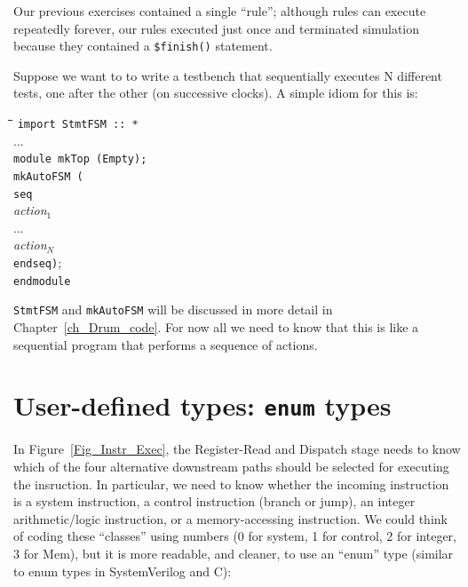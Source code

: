 \label{BSV_small_testbench}


Our previous exercises contained a single ``rule''; although rules can
execute repeatedly forever, our rules executed just once and
terminated simulation because they contained a \verb|$finish()|
statement.

Suppose we want to to write a testbench that sequentially executes N
different tests, one after the other (on successive clocks).  A simple
idiom for this is:

{\footnotesize
\begin{tabbing}
\hmmm \= \hm \= \hm \= \hm \= \kill
      \> {\tt import StmtFSM :: *} \\
      \> ... \\
      \> {\tt module mkTop (Empty);} \\
      \>     \> {\tt mkAutoFSM (} \\
      \>     \>     \> {\tt seq} \\
      \>     \>     \>     \> \emph{action$_1$} \\
      \>     \>     \>     \> ... \\
      \>     \>     \>     \> \emph{action$_N$} \\
      \>     \>     \> {\tt endseq)}; \\
      \> {\tt endmodule}
\end{tabbing}}

{\tt StmtFSM} and \verb|mkAutoFSM| will be discussed in more detail in
Chapter~\ref{ch_Drum_code}.  For now all we need to know that this is
like a sequential program that performs a sequence of actions.




\section{User-defined types: {\tt enum} types}

\label{BSV_enum_types}


In Figure~\ref{Fig_Instr_Exec}, the Register-Read and Dispatch stage
needs to know which of the four alternative downstream paths should be
selected for executing the insruction.  In particular, we need to know
whether the incoming instruction is a system instruction, a control
instruction (branch or jump), an integer arithmetic/logic instruction,
or a memory-accessing instruction.  We could think of coding these
``classes'' using numbers (0 for system, 1 for control, 2 for integer,
3 for Mem), but it is more readable, and cleaner, to use an ``enum''
type (similar to enum types in SystemVerilog and C):

